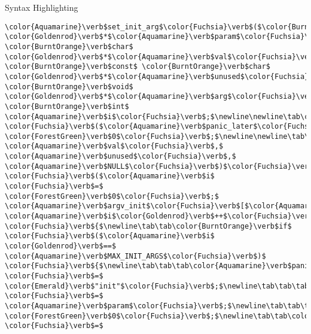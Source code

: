\begin{frame}{Syntax Highlighting}
\begin{verbatim}
\color{Aquamarine}\verb$set_init_arg$\color{Fuchsia}\verb$($\color{BurntOrange}\verb$char$ \color{Goldenrod}\verb$*$\color{Aquamarine}\verb$param$\color{Fuchsia}\verb$,$ \color{BurntOrange}\verb$char$ \color{Goldenrod}\verb$*$\color{Aquamarine}\verb$val$\color{Fuchsia}\verb$,$\newline\tab\tab\tab       \color{BurntOrange}\verb$const$ \color{BurntOrange}\verb$char$ \color{Goldenrod}\verb$*$\color{Aquamarine}\verb$unused$\color{Fuchsia}\verb$,$ \color{BurntOrange}\verb$void$ \color{Goldenrod}\verb$*$\color{Aquamarine}\verb$arg$\color{Fuchsia}\verb$)$\newline\color{Fuchsia}\verb${$\newline\tab\color{BurntOrange}\verb$unsigned$ \color{BurntOrange}\verb$int$ \color{Aquamarine}\verb$i$\color{Fuchsia}\verb$;$\newline\newline\tab\color{BurntOrange}\verb$if$ \color{Fuchsia}\verb$($\color{Aquamarine}\verb$panic_later$\color{Fuchsia}\verb$)$\newline\tab\tab\color{BurntOrange}\verb$return$ \color{ForestGreen}\verb$0$\color{Fuchsia}\verb$;$\newline\newline\tab\color{Aquamarine}\verb$repair_env_string$\color{Fuchsia}\verb$($\color{Aquamarine}\verb$param$\color{Fuchsia}\verb$,$ \color{Aquamarine}\verb$val$\color{Fuchsia}\verb$,$ \color{Aquamarine}\verb$unused$\color{Fuchsia}\verb$,$ \color{Aquamarine}\verb$NULL$\color{Fuchsia}\verb$)$\color{Fuchsia}\verb$;$\newline\newline\tab\color{BurntOrange}\verb$for$ \color{Fuchsia}\verb$($\color{Aquamarine}\verb$i$ \color{Fuchsia}\verb$=$ \color{ForestGreen}\verb$0$\color{Fuchsia}\verb$;$ \color{Aquamarine}\verb$argv_init$\color{Fuchsia}\verb$[$\color{Aquamarine}\verb$i$\color{Fuchsia}\verb$]$\color{Fuchsia}\verb$;$ \color{Aquamarine}\verb$i$\color{Goldenrod}\verb$++$\color{Fuchsia}\verb$)$ \color{Fuchsia}\verb${$\newline\tab\tab\color{BurntOrange}\verb$if$ \color{Fuchsia}\verb$($\color{Aquamarine}\verb$i$ \color{Goldenrod}\verb$==$ \color{Aquamarine}\verb$MAX_INIT_ARGS$\color{Fuchsia}\verb$)$ \color{Fuchsia}\verb${$\newline\tab\tab\tab\color{Aquamarine}\verb$panic_later$ \color{Fuchsia}\verb$=$ \color{Emerald}\verb$"init"$\color{Fuchsia}\verb$;$\newline\tab\tab\tab\color{Aquamarine}\verb$panic_param$ \color{Fuchsia}\verb$=$ \color{Aquamarine}\verb$param$\color{Fuchsia}\verb$;$\newline\tab\tab\tab\color{BurntOrange}\verb$return$ \color{ForestGreen}\verb$0$\color{Fuchsia}\verb$;$\newline\tab\tab\color{Fuchsia}\verb$}$\newline\tab\color{Fuchsia}\verb$}$\newline\tab\color{Aquamarine}\verb$argv_init$\color{Fuchsia}\verb$[$\color{Aquamarine}\verb$i$\color{Fuchsia}\verb$]$ \color{Fuchsia}\verb$=$ 
\end{verbatim}
\end{frame}
